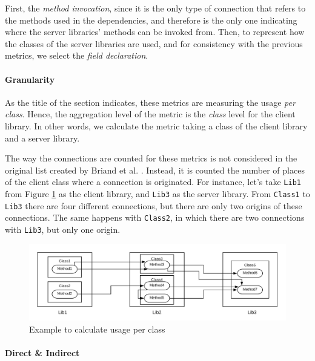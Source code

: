First, the \textit{method invocation}, since it is the only type of connection that refers to the methods used in the dependencies, and therefore is the only one indicating where the server libraries' methods can be invoked from. Then, to represent how the classes of the server libraries are used, and for consistency with the previous metrics, we select the \textit{field declaration}.

\paragraph{Granularity}

As the title of the section indicates, these metrics are measuring the usage \textit{per class}. Hence, the aggregation level of the metric is the \textit{class} level for the client library. In other words, we calculate the metric taking a class of the client library and a server library.

The way the connections are counted for these metrics is not considered in the original list created by Briand et al. \cite{briand1999unified}. Instead, it is counted the number of places of the client class where a connection is originated. For instance, let's take \texttt{Lib1} from Figure \ref{fig:example-impact-per-class} as the client library, and \texttt{Lib3} as the server library. From \texttt{Class1} to \texttt{Lib3} there are four different connections, but there are only two origins of these connections. The same happens with \texttt{Class2}, in which there are two connections with \texttt{Lib3}, but only one origin.

\begin{figure}[ht]
\begin{center}
\includegraphics[width=\textwidth]{figures/impact-per-class.png}
\caption{Example to calculate usage per class}
\label{fig:example-impact-per-class}
\end{center}
\end{figure}

\paragraph{Direct \& Indirect}

